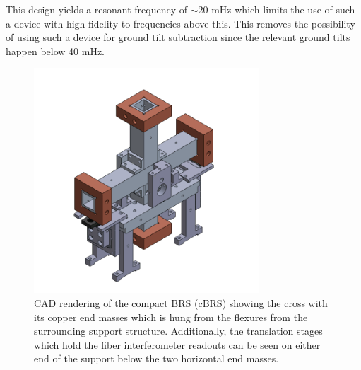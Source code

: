 \documentclass [12pt, proquest]{uwthesis}[2019]
\begin{document}
This design yields a resonant frequency of $\sim$20 mHz which limits the use of such a device with high fidelity to frequencies above this. This removes the possibility of using such a device for ground tilt subtraction since the relevant ground tilts happen below 40 mHz. 

\begin{figure}[!h]
\begin{center}
\includegraphics[width=0.75\textwidth]{cBRSIso.png}
\end{center}
\caption{CAD rendering of the compact BRS (cBRS) showing the cross with its copper end masses which is hung from the flexures from the surrounding support structure. Additionally, the translation stages which hold the fiber interferometer readouts can be seen on either end of the support below the two horizontal end masses.}
\end{figure}
\end{document}

